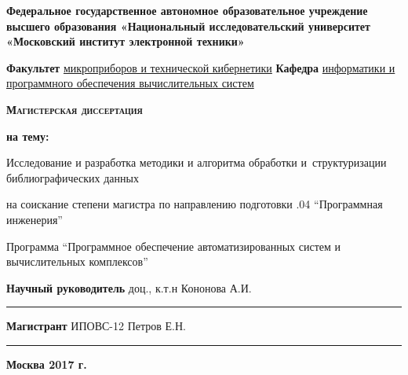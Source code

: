 \newpage

\begin{center}
{\small \textbf{Федеральное государственное автономное образовательное учреждение высшего образования
«Национальный исследовательский университет «Московский институт электронной техники»}}
\end{center}

\begin{flushleft}
{\small \textbf{Факультет} \underline{микроприборов и технической кибернетики}} \linebreak
{\small \textbf{Кафедра} \underline{информатики и программного обеспечения вычислительных систем}}
\end{flushleft}

\vspace{1em}

\begin{center}
\textsc{\textbf{Магистерская диссертация}}
\end{center}

\begin{center}
\textbf{на тему:}
\end{center}

\vspace{1.0em}

\begin{center}
Исследование и разработка методики и алгоритма обработки и~структуризации библиографических данных
\end{center}

\vspace{1em}

\begin{center}
на соискание степени магистра по направлению подготовки .04 “Программная инженерия”
\end{center}

\begin{center}
Программа “Программное обеспечение автоматизированных систем и \linebreak
вычислительных комплексов”
\end{center}

\vspace{\fill}

\begin{flushright}
\textbf{Научный руководитель} доц., к.т.н \linebreak
Кононова А.И. \linebreak
\rule{5cm}{.1pt}

\vspace{1em}

\textbf{Магистрант} ИПОВС-12 \linebreak
Петров Е.Н. \linebreak
\rule{5cm}{.1pt}
\end{flushright}

\begin{center}
\textbf{Москва 2017 г.}
\end{center}

\thispagestyle{empty}